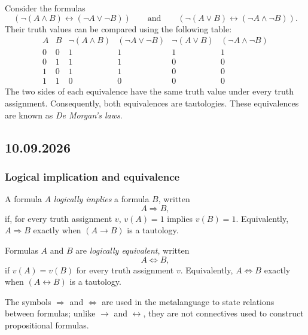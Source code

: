 \documentclass[11pt,a4paper]{amsart}
\begin{document}
\begin{example}
  Consider the formulas
  \[
    (\neg(A\land B)\leftrightarrow(\neg A\lor\neg B))
    \qquad\text{and}\qquad
    (\neg(A\lor B)\leftrightarrow(\neg A\land\neg B)).
  \]
  Their truth values can be compared using the following table:
  \[
    \begin{array}{cc|cc|cc}
      A & B & \neg(A\land B) & (\neg A\lor\neg B)
      & \neg(A\lor B) & (\neg A\land\neg B) \\
      \hline
      0 & 0 & 1 & 1 & 1 & 1 \\
      0 & 1 & 1 & 1 & 0 & 0 \\
      1 & 0 & 1 & 1 & 0 & 0 \\
      1 & 1 & 0 & 0 & 0 & 0
    \end{array}
  \]
  The two sides of each equivalence have the same truth value under every
  truth assignment. Consequently, both equivalences are tautologies. These
  equivalences are known as \emph{De Morgan's laws}.
\end{example}

\subsection{10.09.2026}

\subsubsection{Logical implication and equivalence}

\begin{definition}
  A formula \(A\) \emph{logically implies} a formula \(B\), written
  \[
    A \Rightarrow B,
  \]
  if, for every truth assignment \(v\), \(v(A)=1\) implies \(v(B)=1\).
  Equivalently, \(A \Rightarrow B\) exactly when \((A\rightarrow B)\) is a
  tautology.
\end{definition}

\begin{definition}
  Formulas \(A\) and \(B\) are \emph{logically equivalent}, written
  \[
    A \Leftrightarrow B,
  \]
  if \(v(A)=v(B)\) for every truth assignment \(v\). Equivalently,
  \(A \Leftrightarrow B\) exactly when \((A\leftrightarrow B)\) is a
  tautology.
\end{definition}

The symbols \(\Rightarrow\) and \(\Leftrightarrow\) are used in the
metalanguage to state relations between formulas; unlike \(\rightarrow\) and
\(\leftrightarrow\), they are not connectives used to construct propositional
formulas.
\end{document}

